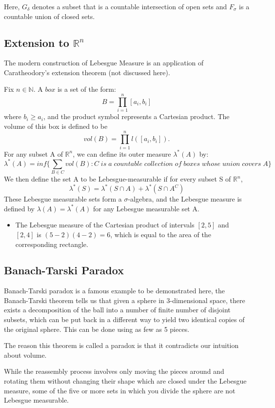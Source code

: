 \documentclass{article}
\begin{document}
Here, $G_{\delta}$ denotes a subset that is a countable intersection of open sets and $F_{\sigma}$ is a countable union of closed sets.

\subsection{Extension to $\mathbb{R}^n$}

The modern construction of Lebesgue Measure is an application of 
Caratheodory's extension theorem (not discussed here).

Fix $n \in \mathbb{N}$. A $box$ is a set of the form:
$$ B= \prod_{i=1}^{n}[a_i,b_i]$$
where $b_i \geq a_i$, and the product symbol represents a Cartesian product. The volume of this box is defined to be
$$ vol(B)=\prod_{i=1}^{n}l([a_i,b_i]).$$
For any subset A of $\mathbb{R}^n$, we can define its outer measure $\lambda^{*}(A)$ by:
$$\lambda^{*}(A)=inf\Big\{ \sum_{B \in C}vol(B): C\; is\; a\; countable \;collection\; of \;boxes\; whose\; union\; covers \; A\Big\}$$
We then define the set A to be Lebesgue-measurable if for every subset S of $\mathbb{R}^n$, 
$$\lambda^{*}(S)= \lambda^{*}(S \cap A) + \lambda^{*}(S \cap A^C)$$
These Lebesgue measurable sets form a $\sigma$-algebra, and the Lebesgue measure is defined by $\lambda(A)=\lambda^{*}(A)$ for any Lebesgue measurable set A.
\begin{itemize}
    \item The Lebesgue measure of the Cartesian product of intervals $[2, 5]$ and $[2, 4]$ is $(5-2)(4-2) = 6$, which is equal to the area of the corresponding rectangle.
\end{itemize}

\subsection{Banach-Tarski Paradox}
Banach-Tarski paradox is a famous example to be demonstrated here, the Banach-Tarski theorem tells us that given a sphere in 3-dimensional space, there exists a decomposition of the ball into a number of finite number of disjoint subsets, which can be put back in a different way to yield two identical copies of the original sphere. This can be done using as few as 5 pieces.

The reason this theorem is called a paradox is that it contradicts our intuition about volume.

While the reassembly process involves only moving the pieces around and rotating them without changing their shape which are closed under the Lebesgue measure, some of the five or more sets in which you divide the sphere are not Lebesgue measurable.
\end{document}
